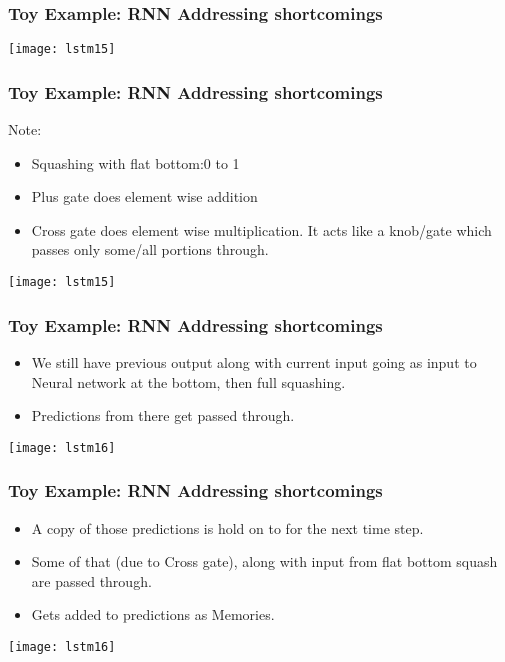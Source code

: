 \begin{frame}[fragile] \frametitle{Toy Example: RNN Addressing shortcomings}
\begin{center}
\texttt{[image: lstm15]}
\end{center}
\end{frame}


\begin{frame}[fragile] \frametitle{Toy Example: RNN Addressing shortcomings}
Note:
\begin{itemize}
\item Squashing with flat bottom:0 to 1 
\item Plus gate does element wise addition
\item Cross gate does element wise multiplication. It acts like a knob/gate which passes only some/all portions through.
\end{itemize}
\begin{center}
\texttt{[image: lstm15]}
\end{center}
\end{frame}

\begin{frame}[fragile] \frametitle{Toy Example: RNN Addressing shortcomings}
\begin{itemize}
\item We still have previous output along with current input going as input to Neural network at the bottom, then full squashing.
\item Predictions from there get passed through.
\end{itemize}
\begin{center}
\texttt{[image: lstm16]}
\end{center}
\end{frame}

\begin{frame}[fragile] \frametitle{Toy Example: RNN Addressing shortcomings}
\begin{itemize}
\item A copy of those predictions is hold on to for the next time step.
\item Some of that (due to Cross gate), along with input from flat bottom squash are passed through. 
\item Gets added to predictions as Memories.
\end{itemize}
\begin{center}
\texttt{[image: lstm16]}
\end{center}
\end{frame}

